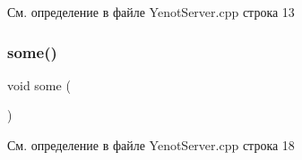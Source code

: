 См. определение в файле Yenot\+Server.\+cpp строка 13

\mbox{\label{group__serveryenotservercpp_ga3bf507bc2b43ea8ed45bdfeaf8d11171}} 
\subsubsection{\texorpdfstring{some()}{some()}}
{\footnotesize\ttfamily void some (\begin{DoxyParamCaption}{ }\end{DoxyParamCaption})}



См. определение в файле Yenot\+Server.\+cpp строка 18

